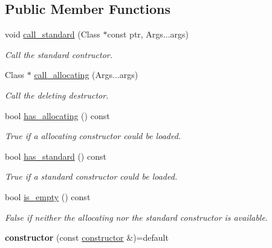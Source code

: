\subsection*{Public Member Functions}
\begin{DoxyCompactItemize}
\item 
void \hyperlink{a00064_a2b0dbd4b6c5fb1c8fa284b64f85e3caa}{call\+\_\+standard} (Class $\ast$const ptr, Args...\+args)\hypertarget{a00064_a2b0dbd4b6c5fb1c8fa284b64f85e3caa}{}\label{a00064_a2b0dbd4b6c5fb1c8fa284b64f85e3caa}

\begin{DoxyCompactList}\small\item\em Call the standard contructor. \end{DoxyCompactList}\item 
Class $\ast$ \hyperlink{a00064_a9674344355e9759b8f60a4eb92e718af}{call\+\_\+allocating} (Args...\+args)\hypertarget{a00064_a9674344355e9759b8f60a4eb92e718af}{}\label{a00064_a9674344355e9759b8f60a4eb92e718af}

\begin{DoxyCompactList}\small\item\em Call the deleting destructor. \end{DoxyCompactList}\item 
bool \hyperlink{a00064_a2bb649c5d51e8ae9656db16b65776f1c}{has\+\_\+allocating} () const \hypertarget{a00064_a2bb649c5d51e8ae9656db16b65776f1c}{}\label{a00064_a2bb649c5d51e8ae9656db16b65776f1c}

\begin{DoxyCompactList}\small\item\em True if a allocating constructor could be loaded. \end{DoxyCompactList}\item 
bool \hyperlink{a00064_a383752514de8d2f1ffdd142f642e54a3}{has\+\_\+standard} () const \hypertarget{a00064_a383752514de8d2f1ffdd142f642e54a3}{}\label{a00064_a383752514de8d2f1ffdd142f642e54a3}

\begin{DoxyCompactList}\small\item\em True if a standard constructor could be loaded. \end{DoxyCompactList}\item 
bool \hyperlink{a00064_af65e82bd30161ccf3ea05f87193c3fa1}{is\+\_\+empty} () const \hypertarget{a00064_af65e82bd30161ccf3ea05f87193c3fa1}{}\label{a00064_af65e82bd30161ccf3ea05f87193c3fa1}

\begin{DoxyCompactList}\small\item\em False if neither the allocating nor the standard constructor is available. \end{DoxyCompactList}\item 
{\bfseries constructor} (const \hyperlink{a00063}{constructor} \&)=default\hypertarget{a00064_a6ae77617757558a1b0177d6a2cae9827}{}\label{a00064_a6ae77617757558a1b0177d6a2cae9827}


\end{DoxyCompactItemize}
